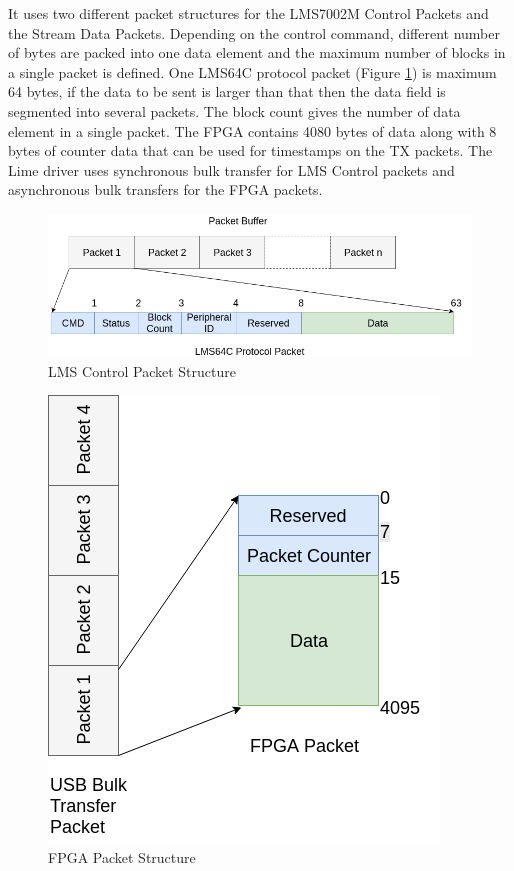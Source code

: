 It uses two different packet structures for the LMS7002M Control Packets and the Stream Data Packets. Depending on the control command, different number of bytes are packed into one data element and the maximum number of blocks in a single packet is defined. One LMS64C protocol packet (Figure \ref{lms_packet}) is maximum 64 bytes, if the data to be sent is larger than that then the data field is segmented into several packets. The block count gives the number of data element in a single packet. The FPGA contains 4080 bytes of data along with 8 bytes of counter data that can be used for timestamps on the TX packets. The Lime driver uses synchronous bulk transfer for LMS Control packets and asynchronous bulk transfers for the FPGA packets.
\begin{figure}[h!]
\centering
\includegraphics[width=\textwidth]{Figure/LMS64C_Packet.png}
\caption{LMS Control Packet Structure}
\label{lms_packet}
\end{figure}

\begin{figure}[h!]
\centering
\includegraphics[scale=0.6]{Figure/FPGA_Packet.png}
\caption{FPGA Packet Structure}
\label{fpga_packet}
\end{figure}

